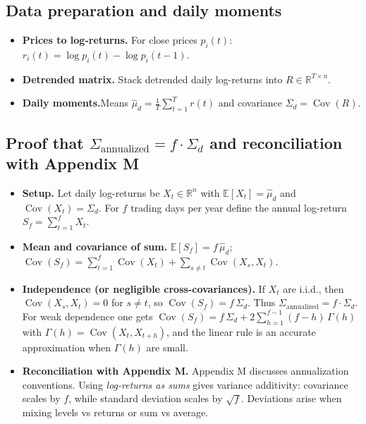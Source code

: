 \documentclass[11pt]{article}
\begin{document}
	\subsection{Data preparation and daily moments}
	\begin{itemize}
		\item \textbf{Prices to log-returns.} For close prices $p_i(t)$: $r_i(t)=\log p_i(t)-\log p_i(t-1)$.
		\item \textbf{Detrended matrix.} Stack detrended daily log-returns into $R\in\mathbb{R}^{T\times n}$.
		\item \textbf{Daily moments.}\;Means $\hat{\mu}_d=\tfrac1T\sum_{t=1}^T r(t)$ and covariance $\Sigma_d=\operatorname{Cov}(R)$.
	\end{itemize}
	
	\subsection{Proof that $\Sigma_{\text{annualized}}=f\cdot\Sigma_d$ and reconciliation with Appendix M}
	\begin{itemize}
		\item \textbf{Setup.} Let daily log-returns be $X_t\in\mathbb{R}^n$ with $\mathbb{E}[X_t]=\hat{\mu}_d$ and $\operatorname{Cov}(X_t)=\Sigma_d$. For $f$ trading days per year define the annual log-return $S_f=\sum_{t=1}^{f} X_t$.
		\item \textbf{Mean and covariance of sum.} $\mathbb{E}[S_f]=f\,\hat{\mu}_d$; $\operatorname{Cov}(S_f)=\sum_{t=1}^{f}\operatorname{Cov}(X_t)+\sum_{s\neq t}\operatorname{Cov}(X_s,X_t)$.
		\item \textbf{Independence (or negligible cross-covariances).} If $X_t$ are i.i.d., then $\operatorname{Cov}(X_s,X_t)=0$ for $s\neq t$, so $\operatorname{Cov}(S_f)=f\,\Sigma_d$. Thus $\boxed{\Sigma_{\text{annualized}}=f\cdot\Sigma_d}$. For weak dependence one gets $\operatorname{Cov}(S_f)=f\,\Sigma_d+2\sum_{h=1}^{f-1}(f-h)\,\Gamma(h)$ with $\Gamma(h)=\operatorname{Cov}(X_t,X_{t+h})$, and the linear rule is an accurate approximation when $\Gamma(h)$ are small.
		\item \textbf{Reconciliation with Appendix M.} Appendix M discusses annualization conventions. Using \emph{log-returns as sums} gives variance additivity: covariance scales by $f$, while standard deviation scales by $\sqrt{f}$. Deviations arise when mixing levels vs returns or sum vs average.
	\end{itemize}
	
	\newpage
	
\end{document}
